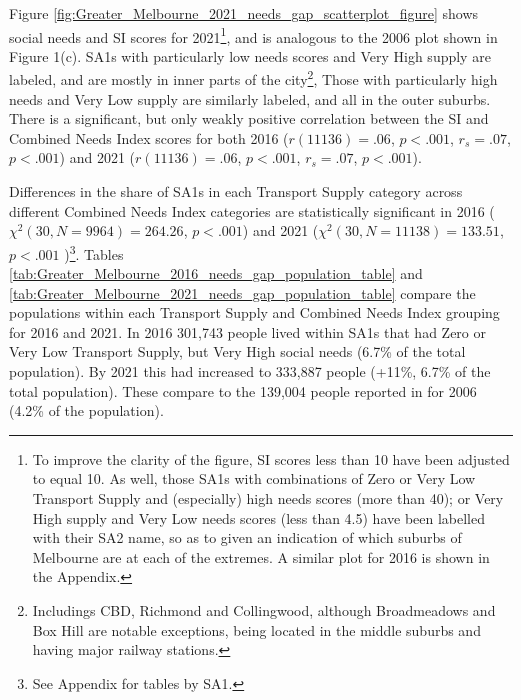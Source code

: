 \documentclass[preprint, 3p,
authoryear]{elsarticle} %
\begin{document}
Figure \ref{fig:Greater_Melbourne_2021_needs_gap_scatterplot_figure}
shows social needs and SI scores for 2021\footnote{To improve the
  clarity of the figure, SI scores less than 10 have been adjusted to
  equal 10. As well, those SA1s with combinations of Zero or Very Low
  Transport Supply and (especially) high needs scores (more than 40); or
  Very High supply and Very Low needs scores (less than 4.5) have been
  labelled with their SA2 name, so as to given an indication of which
  suburbs of Melbourne are at each of the extremes. A similar plot for
  2016 is shown in the Appendix.}, and is analogous to the 2006 plot
shown in Figure 1(c). SA1s with particularly low needs scores and Very
High supply are labeled, and are mostly in inner parts of the
city\footnote{Includings CBD, Richmond and Collingwood, although
  Broadmeadows and Box Hill are notable exceptions, being located in the
  middle suburbs and having major railway stations.}, Those with
particularly high needs and Very Low supply are similarly labeled, and
all in the outer suburbs. There is a significant, but only weakly
positive correlation between the SI and Combined Needs Index scores for
both 2016 (\(r(11136) = .06\), \(p < .001\), \(r_s =.07\), \(p < .001\))
and 2021 (\(r(11136) = .06\), \(p < .001\), \(r_s =.07\), \(p < .001\)).

Differences in the share of SA1s in each Transport Supply category
across different Combined Needs Index categories are statistically
significant in 2016 (\(\chi^2(30, N = 9964) = 264.26\), \(p < .001\))
and 2021 (\(\chi^2(30, N = 11138) = 133.51\), \(p < .001\) )\footnote{See
  Appendix for tables by SA1.}. Tables
\ref{tab:Greater_Melbourne_2016_needs_gap_population_table} and
\ref{tab:Greater_Melbourne_2021_needs_gap_population_table} compare the
populations within each Transport Supply and Combined Needs Index
grouping for 2016 and 2021. In 2016 301,743 people lived within SA1s
that had Zero or Very Low Transport Supply, but Very High social needs
(6.7\% of the total population). By 2021 this had increased to 333,887
people (+11\%, 6.7\% of the total population). These compare to the
139,004 people reported in \citet{currie2010identifying} for 2006 (4.2\%
of the population).
\end{document}

